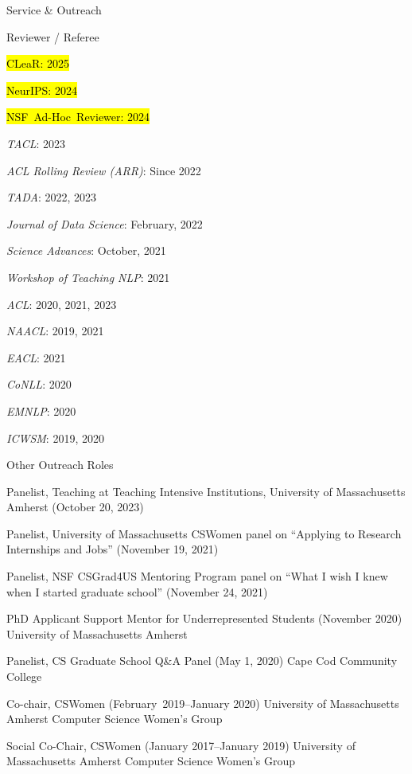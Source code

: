 \documentclass{resume} %
\begin{document}
\begin{rSection}{Service \& Outreach}
\noindent
\begin{rSubsection}{Reviewer / Referee}{}{}{}
\item \hl{CLeaR: 2025}
\item \hl{NeurIPS: 2024}
\item \hl{NSF~Ad-Hoc~Reviewer: 2024}
\item \emph{TACL}: 2023
\item \emph{ACL Rolling Review (ARR)}: Since 2022
\item \emph{TADA}: 2022, 2023
\item \emph{Journal of Data Science}: February, 2022
\item \emph{Science Advances}: October, 2021
\item \emph{Workshop of Teaching NLP}: 2021
\item \emph{ACL}: 2020, 2021, 2023
\item \emph{NAACL}: 2019, 2021
\item \emph{EACL}: 2021 
\item \emph{CoNLL}: 2020 
\item \emph{EMNLP}: 2020 
\item \emph{ICWSM}: 2019, 2020
\end{rSubsection}

\begin{rSubsection}{Other Outreach Roles}{}{}{}
\item Panelist, Teaching at Teaching Intensive Institutions, University of Massachusetts Amherst (October 20, 2023)
\item Panelist, University of Massachusetts CSWomen panel on ``Applying to Research Internships and Jobs'' (November 19, 2021)
\item Panelist, NSF CSGrad4US Mentoring Program panel on ``What I wish I knew when I started graduate school'' (November 24, 2021)
\item 
{PhD Applicant Support Mentor for Underrepresented Students} ({November 2020}) {University of Massachusetts Amherst}
\item 
{Panelist, CS Graduate School Q\&A Panel} ({May 1, 2020}) {Cape Cod Community College}

\item 
{Co-chair, CSWomen} ({February~2019--January 2020}) {University of Massachusetts Amherst Computer Science Women's Group}

\item 
{Social Co-Chair,  CSWomen} ({January 2017--January 2019}) 
{University of Massachusetts Amherst Computer Science Women's Group}


\end{rSubsection}
\end{rSection}
\end{document}
